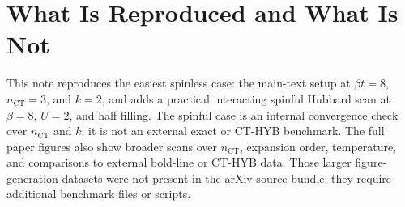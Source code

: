\documentclass[11pt,a4paper]{article}
\theoremstyle{definition}
\theoremstyle{plain}
\begin{document}
\section{What Is Reproduced and What Is Not}

This note reproduces the easiest spinless case: the main-text setup at
$\beta t=8$, $n_{\mathrm{CT}}=3$, and $k=2$, and adds a practical interacting
spinful Hubbard scan at $\beta=8$, $U=2$, and half filling.  The spinful case
is an internal convergence check over $n_{\mathrm{CT}}$ and $k$; it is not an
external exact or CT-HYB benchmark.  The full paper figures also show broader
scans over $n_{\mathrm{CT}}$, expansion order, temperature, and comparisons to
external bold-line or CT-HYB data.  Those larger figure-generation datasets
were not present in the arXiv source bundle; they require additional benchmark
files or scripts.
\end{document}
